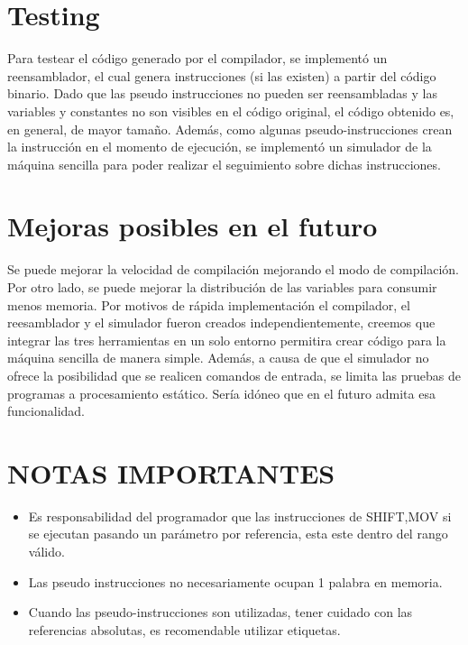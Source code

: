 \documentclass[12pt]{article}
\begin{document}
\section{Testing}
Para testear el c\'odigo generado por el compilador, se implement\'o un reensamblador,
el cual genera instrucciones (si las existen) a partir del c\'odigo binario. Dado que
las pseudo instrucciones no pueden ser reensambladas y las variables y constantes no
son visibles en el c\'odigo original, el c\'odigo obtenido es, en general, de mayor
tama\~no. Adem\'as, como algunas pseudo-instrucciones crean la instrucci\'on en el momento de ejecuci\'on, se implement\'o un simulador de la m\'aquina sencilla para poder realizar el seguimiento sobre dichas instrucciones.

\section{Mejoras posibles en el futuro}

Se puede mejorar la velocidad de compilaci\'on mejorando el modo de compilaci\'on. Por otro lado, se puede mejorar la distribuci\'on de las variables para consumir menos memoria.  Por motivos de r\'apida implementaci\'on el compilador, el reesamblador y el simulador fueron creados independientemente, creemos que integrar las tres herramientas en un solo entorno permitira crear c\'odigo para la m\'aquina sencilla de manera simple. Adem\'as, a causa de que el simulador no ofrece la posibilidad que se realicen comandos de entrada, se limita las pruebas de programas a procesamiento est\'atico. Ser\'ia id\'oneo que en el futuro admita esa funcionalidad.

\section{NOTAS IMPORTANTES	}
\begin{itemize}
    \item Es responsabilidad del programador que las instrucciones de SHIFT,MOV
si se ejecutan pasando un par\'ametro por referencia, esta este dentro 
del rango v\'alido.
    \item Las pseudo instrucciones no necesariamente ocupan 1 palabra en memoria.
    \item Cuando las pseudo-instrucciones son utilizadas, tener cuidado con las referencias absolutas, es recomendable utilizar etiquetas.
\end{itemize}

\end{document}

